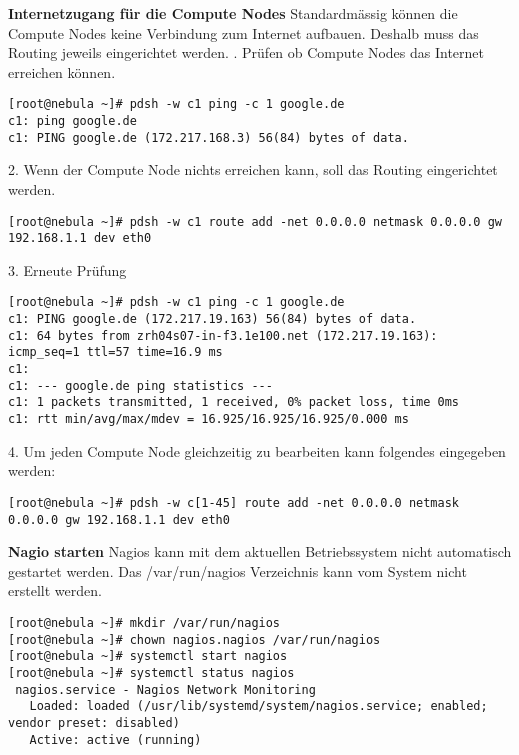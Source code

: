 \textbf{Internetzugang für die Compute Nodes}\newline
Standardmässig können die Compute Nodes keine Verbindung zum Internet aufbauen. Deshalb muss das Routing jeweils eingerichtet werden. . Prüfen ob Compute Nodes das Internet erreichen können.
\begin{lstlisting}
[root@nebula ~]# pdsh -w c1 ping -c 1 google.de
c1: ping google.de
c1: PING google.de (172.217.168.3) 56(84) bytes of data.
\end{lstlisting}
2. Wenn der Compute Node nichts erreichen kann, soll das Routing eingerichtet werden.
\begin{lstlisting}
[root@nebula ~]# pdsh -w c1 route add -net 0.0.0.0 netmask 0.0.0.0 gw 192.168.1.1 dev eth0
\end{lstlisting}
3. Erneute Prüfung 
\begin{lstlisting}
[root@nebula ~]# pdsh -w c1 ping -c 1 google.de
c1: PING google.de (172.217.19.163) 56(84) bytes of data.
c1: 64 bytes from zrh04s07-in-f3.1e100.net (172.217.19.163): icmp_seq=1 ttl=57 time=16.9 ms
c1:
c1: --- google.de ping statistics ---
c1: 1 packets transmitted, 1 received, 0% packet loss, time 0ms
c1: rtt min/avg/max/mdev = 16.925/16.925/16.925/0.000 ms
\end{lstlisting}
4. Um jeden Compute Node gleichzeitig zu bearbeiten kann folgendes eingegeben werden:
\begin{lstlisting}
[root@nebula ~]# pdsh -w c[1-45] route add -net 0.0.0.0 netmask 0.0.0.0 gw 192.168.1.1 dev eth0
\end{lstlisting}

\textbf{Nagio starten}\newline
Nagios kann mit dem aktuellen Betriebssystem nicht automatisch gestartet werden. Das /var/run/nagios Verzeichnis kann vom System nicht erstellt werden.
\begin{lstlisting}
[root@nebula ~]# mkdir /var/run/nagios
[root@nebula ~]# chown nagios.nagios /var/run/nagios
[root@nebula ~]# systemctl start nagios
[root@nebula ~]# systemctl status nagios
 nagios.service - Nagios Network Monitoring
   Loaded: loaded (/usr/lib/systemd/system/nagios.service; enabled; vendor preset: disabled)
   Active: active (running) 
\end{lstlisting}

